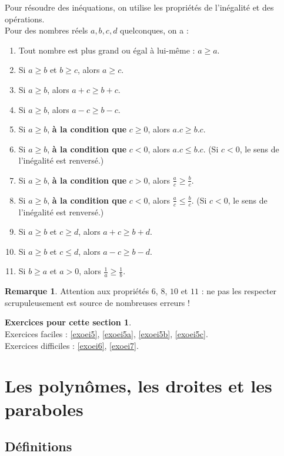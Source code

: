 \documentclass[a4paper,13pt]{scrreprt}
\theoremstyle{plain}
\theoremstyle{definition}
\newtheorem{rema}[subsection]{Remarque}
\newtheorem*{epcs}{Exercices pour cette section}
\begin{document}
\newpage

Pour résoudre des inéquations, on utilise les propriétés de l'inégalité et des opérations. \\ Pour des nombres réels $a,b,c,d$ quelconques, on a :

\begin{enumerate}
	\item Tout nombre est plus grand ou égal à lui-même : $a \ge a$.
	\item Si $a \ge b$ et $b \ge c$, alors $a \ge c$.
	\item Si $a \ge b$, alors $a+c \ge b+c$.
	\item Si $a \ge b$, alors $a-c \ge b-c$.
	\item Si $a \ge b$, \textbf{à la condition que} $c \ge 0$, alors $a.c \ge b.c$.
	\item Si $a \ge b$, \textbf{à la condition que} $c < 0$, alors $a.c \le b.c$. (Si $c<0$, le sens de l'inégalité est renversé.)
	\item Si $a \ge b$, \textbf{à la condition que} $c > 0$, alors $\frac{a}{c} \ge \frac{b}{c}$.
	\item Si $a \ge b$, \textbf{à la condition que} $c < 0$, alors $\frac{a}{c} \le \frac{b}{c}$. (Si $c<0$, le sens de l'inégalité est renversé.)
	\item Si $a \ge b$ et $c \ge d$, alors $a+c \ge b+d$.
	\item Si $a \ge b$ et $c \le d$, alors $a-c \ge b-d$.
	\item Si $b \ge a$ et $a > 0$, alors $\frac{1}{a} \ge \frac{1}{b}$.
\end{enumerate}
\begin{rema}
	Attention aux propriétés $6$, $8$, $10$ et $11$ : ne pas les respecter scrupuleusement est source de nombreuses erreurs !
\end{rema}

\begin{epcs}
	~~\\
	Exercices faciles : \ref{exoei5}, \ref{exoei5a}, \ref{exoei5b}, \ref{exoei5c}.\\
	Exercices difficiles : \ref{exoei6}, \ref{exoei7}.
\end{epcs}

\chapter{Les polynômes, les droites et les paraboles}

\section{Définitions} \label{sectionpoly}
	
\end{document}
